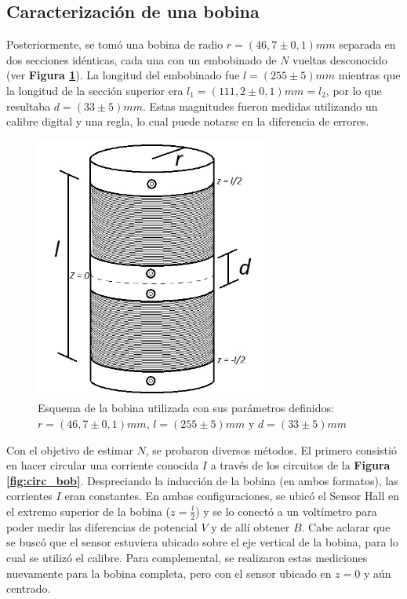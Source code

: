 \documentclass[11pt,a4paper]{article}
\begin{document}
\subsection{Caracterización de una bobina}

Posteriormente, se tomó una bobina de radio $r = (46,7 \pm 0,1)mm$ separada en dos secciones idénticas, cada una con un embobinado de $N$ vueltas desconocido (ver \textbf{Figura \ref{fig:bobina}}). La longitud del embobinado fue $l = (255 \pm 5)mm$ mientras que la longitud de la sección superior era $l_1 = (111,2 \pm 0,1)mm = l_2$, por lo que resultaba $d = (33 \pm 5)mm$. Estas magnitudes fueron medidas utilizando un calibre digital y una regla, lo cual puede notarse en la diferencia de errores. 

\begin{figure}[h!]
\centering
   \includegraphics[width=0.7\textwidth]{Bobina}
   \caption{Esquema de la bobina utilizada con sus parámetros definidos: $r = (46,7 \pm 0,1)mm$, $l = (255 \pm 5)mm$ y $d = (33 \pm 5)mm$}  
   \label{fig:bobina}
\end{figure}

Con el objetivo de estimar $N$, se probaron diversos métodos. El primero consistió en hacer circular una corriente conocida $I$ a través de los circuitos de la \textbf{Figura \ref{fig:circ_bob}}. Despreciando la inducción de la bobina (en ambos formatos), las corrientes $I$ eran constantes. En ambas configuraciones, se ubicó el Sensor Hall en el extremo superior de la bobina ($z = \frac{l}{2}$) y se lo conectó a un voltímetro para poder medir las diferencias de potencial $V$ y de allí obtener $B$. Cabe aclarar que se buscó que el sensor estuviera ubicado sobre el eje vertical de la bobina, para lo cual se utilizó el calibre. Para complemental, se realizaron estas mediciones nuevamente para la bobina completa, pero con el sensor ubicado en $z = 0$ y aún centrado. 
\end{document}
